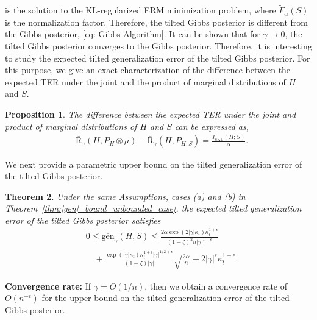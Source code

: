 \documentclass{article}
\theoremstyle{plain}
\theoremstyle{plain}
\newtheorem{theorem}{Theorem}[section]
\newtheorem{proposition}[theorem]{Proposition}
\theoremstyle{definition}
\theoremstyle{remark}
\newtheorem{remark}[theorem]{Remark}
\newcommand{\RTT}{\overline{\mathrm{R}}_{\gamma}}
\begin{document}
    is the solution to the KL-regularized ERM minimization problem, where $\tilde{F}_{\alpha}(S)$ is the normalization factor. Therefore, the tilted Gibbs posterior is different from the Gibbs posterior, \eqref{eq: Gibbs Algorithm}. It can be shown that for $\gamma\rightarrow 0$, the tilted Gibbs posterior converges to the Gibbs posterior. Therefore, it is interesting to study the expected tilted generalization error of the tilted Gibbs posterior. For this purpose, we give an exact characterization of the difference between the expected TER under the joint and the product of marginal distributions of $H$ and $S$.
    \begin{proposition}\label{prop: Gibbs tilted gen}
      The difference between the expected TER under the joint and product of marginal distributions of $H$ and $S$ can be expressed as,
        \begin{equation}
    \begin{split}
         &\RTT(H,P_{H}\otimes \mu)-\RTT(H,P_{H,S})=\frac{ I_{\mathrm{SKL}}(H;S)}{\alpha}.
    \end{split}
\end{equation}
    \end{proposition}
We next provide a parametric upper bound on the tilted generalization error of the tilted Gibbs posterior.   
    \begin{theorem}\label{thm: tilted gibbs gen_unbounded}
        Under the same Assumptions, cases (a) and (b) in Theorem~\ref{thm:|gen|_bound_unbounded_case}, the expected tilted generalization error of the tilted Gibbs posterior satisfies
        \begin{equation}
        \begin{split}
           & 0\leq \overline{\mathrm{gen}}_{\gamma}(H,S)\leq \frac{2\alpha\exp(2|\gamma| \kappa_t)\kappa_t^{1+\epsilon}}{(1-\zeta)^2 n|\gamma|^{1-\epsilon}} \\&\quad+\frac{\exp(|\gamma|\kappa_t)\kappa_t^{1+\epsilon}|\gamma|^{1/2+\epsilon}}{(1-\zeta)|\gamma|}\sqrt{\frac{2\alpha}{n}}+2|\gamma|^{\epsilon}\kappa_t^{1+\epsilon}.
                    \end{split}
        \end{equation}
    \end{theorem}
\textbf{Convergence rate:} If $\gamma=O(1/n)$, then we obtain a convergence rate of $O(n^{-\epsilon})$ for the upper bound on the tilted generalization error of the tilted Gibbs posterior.
\end{document}
